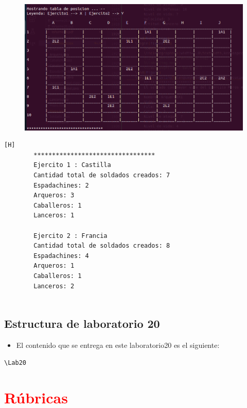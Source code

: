 \documentclass{article}
\begin{document}
	\begin{figure}[H]
		\centering
		\includegraphics[width=1.0\textwidth,keepaspectratio]{img/Commit10.png}
	\end{figure}
	\begin{lstlisting}[language=bash,caption={Ejecucion:}][H]
		*********************************
		Ejercito 1 : Castilla
		Cantidad total de soldados creados: 7
		Espadachines: 2
		Arqueros: 3
		Caballeros: 1
		Lanceros: 1
		
		Ejercito 2 : Francia
		Cantidad total de soldados creados: 8
		Espadachines: 4
		Arqueros: 1
		Caballeros: 1
		Lanceros: 2
		
	\end{lstlisting}
	\subsection{Estructura de laboratorio 20}
	\begin{itemize}	
		\item El contenido que se entrega en este laboratorio20 es el siguiente:
	\end{itemize}
	\begin{lstlisting}[style=ascii-tree]
	\Lab20
	\end{lstlisting}    
	\section{\textcolor{red}{Rúbricas}}
	
\end{document}
